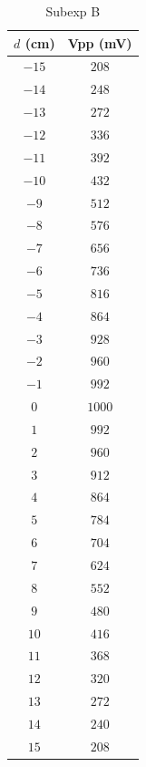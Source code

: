 \begin{table}[htb!]
\centering
\caption{Subexp B}
\begin{tabular}{cc}
\toprule
$d$ (\unit{\cm}) & Vpp (\unit{\mV}) \\
\midrule
$-15$ & $208$ \\
$-14$ & $248$ \\
$-13$ & $272$ \\
$-12$ & $336$ \\
$-11$ & $392$ \\
$-10$ & $432$ \\
$-9$ & $512$ \\
$-8$ & $576$ \\
$-7$ & $656$ \\
$-6$ & $736$ \\
$-5$ & $816$ \\
$-4$ & $864$ \\
$-3$ & $928$ \\
$-2$ & $960$ \\
$-1$ & $992$ \\
$0$ & $1000$ \\
$1$ & $992$ \\
$2$ & $960$ \\
$3$ & $912$ \\
$4$ & $864$ \\
$5$ & $784$ \\
$6$ & $704$ \\
$7$ & $624$ \\
$8$ & $552$ \\
$9$ & $480$ \\
$10$ & $416$ \\
$11$ & $368$ \\
$12$ & $320$ \\
$13$ & $272$ \\
$14$ & $240$ \\
$15$ & $208$ \\
\bottomrule
\end{tabular}
\end{table}

